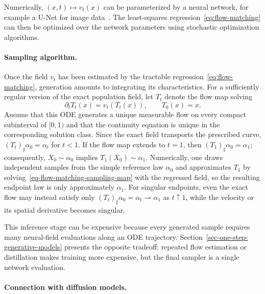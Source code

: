 %
Numerically, $(x,t) \mapsto v_t(x)$ can be parameterized by a neural network, for example a U-Net for image data~\citep{RonnebergerFischerBrox2015UNet}. The least-squares regression~\eqref{eq:flow-matching} can then be optimized over the network parameters using stochastic optimization algorithms.
%

\paragraph{Sampling algorithm.}
Once the field $v_t$ has been estimated by the tractable regression~\eqref{eq:flow-matching}, generation amounts to integrating its characteristics. For a sufficiently regular version of the exact population field, let $T_t$ denote the flow map solving
\begin{equation}\label{eq-flow-matching-sampling-map}
	\partial_tT_t(x)=v_t(T_t(x)),
	\qquad T_0(x)=x.
\end{equation}
Assume that this ODE generates a unique measurable flow on every compact subinterval of $[0,1)$ and that the continuity equation is unique in the corresponding solution class. Since the exact field transports the prescribed curve, $(T_t)_\sharp\alpha_0=\alpha_t$ for $t<1$. If the flow map extends to $t=1$, then $(T_1)_\sharp\alpha_0=\alpha_1$; consequently, $X_0\sim\alpha_0$ implies $T_1(X_0)\sim\alpha_1$. Numerically, one draws independent samples from the simple reference law $\alpha_0$ and approximates $T_1$ by solving~\eqref{eq-flow-matching-sampling-map} with the regressed field, so the resulting endpoint law is only approximately $\alpha_1$. For singular endpoints, even the exact flow may instead satisfy only $(T_t)_\sharp\alpha_0=\alpha_t\rightharpoonup\alpha_1$ as $t\uparrow1$, while the velocity or its spatial derivative becomes singular.

This inference stage can be expensive because every generated sample requires many neural-field evaluations along an ODE trajectory. Section~\ref{sec-one-step-generative-models} presents the opposite tradeoff: repeated flow estimation or distillation makes training more expensive, but the final sampler is a single network evaluation.

\paragraph{Connection with diffusion models.}\label{par-diffusion-model-connection}

